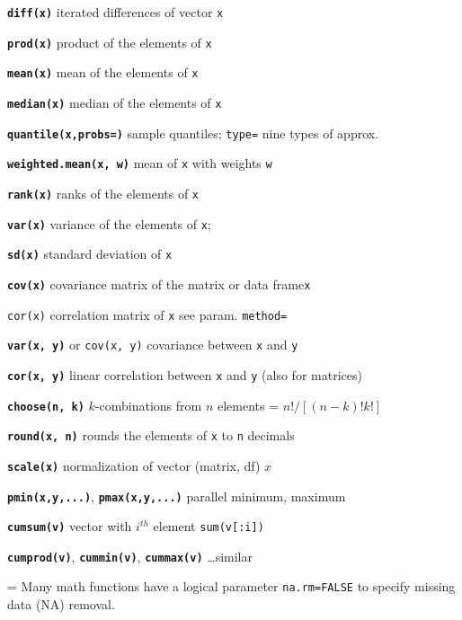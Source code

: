\documentclass[8pt,landscape]{article}
\newcommand{\code}{\texttt}
\newcommand{\bcode}[1]{\texttt{\textbf{#1}}}
\begin{document}
\begin{multicols*}{3}
\bcode{diff(x)}  iterated differences of vector \code{x}

\bcode{prod(x)}  product of the elements of \code{x}

\bcode{mean(x)}  mean of the elements of \code{x}

\bcode{median(x)}  median of the elements of \code{x}

\bcode{quantile(x,probs=)} sample quantiles; \code{type=} nine types of approx.

\bcode{weighted.mean(x, w)} mean of \code{x} with weights \code{w}

\bcode{rank(x)}  ranks of the elements of \code{x}

\bcode{var(x)}  variance of the elements of \code{x};  

\bcode{sd(x)} standard deviation of \code{x}

\bcode{cov(x)}  covariance matrix of the matrix or data frame\code{x}

\code{cor(x)}  correlation matrix of \code{x} see param. \code{method=}

\bcode{var(x, y)} or \code{cov(x, y)}  covariance between \code{x} and \code{y} 

\bcode{cor(x, y)}  linear correlation between \code{x} and \code{y} (also for matrices)

\bcode{choose(n, k)}  $k$-combinations from $n$ elements = $n!/[(n-k)!k!]$

\bcode{round(x, n)}  rounds the elements of \code{x} to \code{n}
decimals

\bcode{scale(x)}  normalization of vector (matrix, df) $x$

\bcode{pmin(x,y,...)}, \bcode{pmax(x,y,...)}  parallel minimum, maximum

\bcode{cumsum(v)} vector with $i^{th}$ element \code{sum(v[:i])}

\bcode{cumprod(v)}, \bcode{cummin(v)}, \bcode{cummax(v)} \dots similar



     

\everypar={\hangindent=0mm}
Many math functions have a logical parameter \code{na.rm=FALSE} to
specify missing data (NA) removal.





\end{multicols*}
\end{document}
